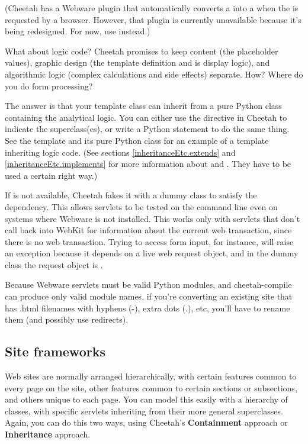 (Cheetah has a Webware plugin that automatically converts a  into a  when the  is
requested by a browser.  However, that plugin is currently unavailable because
it's being redesigned.  For now, use  instead.)

What about logic code?  Cheetah promises to keep content (the placeholder
values), graphic design (the template definition and is display logic), and
algorithmic logic (complex calculations and side effects) separate.  How?
Where do you do form processing?

The answer is that your template class can inherit from a pure Python class
containing the analytical logic.  You can either use the 
directive in Cheetah to indicate the superclass(es), or write a Python
 statement to do the same thing.  See the template
 and its pure Python class
 for an example of a template
inheriting logic code.  (See sections \ref{inheritanceEtc.extends} and
\ref{inheritanceEtc.implements} for more information about  and
.  They have to be used a certain right way.)

If  is not available, Cheetah fakes it with a
dummy class to satisfy the dependency.  This allows servlets to be tested on
the command line even on systems where Webware is not installed.  This works
only with servlets that don't call back into WebKit for information about the
current web transaction, since there is no web transaction.  Trying to access
form input, for instance, will raise an exception because it depends on a
live web request object, and in the dummy class the request object is
.

Because Webware servlets must be valid Python modules, and cheetah-compile
can produce only valid module names, if you're converting an existing site that
has .html filenames with hyphens (-), extra dots (.), etc, you'll have to
rename them (and possibly use redirects).

\subsection{Site frameworks}
\label{webware.siteFrameworks}

Web sites are normally arranged hierarchically, with certain features common 
to every page on the site, other features common to certain sections or
subsections, and others unique to each page.  You can model this easily with
a hierarchy of classes, with specific servlets inheriting from their more
general superclasses.  Again, you can do this two ways, using Cheetah's
{\bf Containment} approach or {\bf Inheritance} approach.

